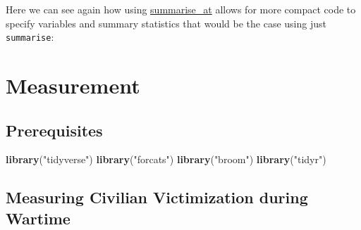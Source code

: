 \documentclass[]{book}
\newenvironment{Shaded}{\begin{snugshade}}{\end{snugshade}}
\newcommand{\CommentTok}[1]{\textcolor[rgb]{0.56,0.35,0.01}{\textit{#1}}}
\newcommand{\KeywordTok}[1]{\textcolor[rgb]{0.13,0.29,0.53}{\textbf{#1}}}
\newcommand{\NormalTok}[1]{#1}
\newcommand{\OperatorTok}[1]{\textcolor[rgb]{0.81,0.36,0.00}{\textbf{#1}}}
\newcommand{\StringTok}[1]{\textcolor[rgb]{0.31,0.60,0.02}{#1}}
\theoremstyle{definition}
\theoremstyle{definition}
\theoremstyle{definition}
\theoremstyle{remark}
\begin{document}
Here we can see again how using
\href{https://www.rdocumentation.org/packages/dplyr/topics/summarise_at}{summarise\_at}
allows for more compact code to specify variables and summary statistics
that would be the case using just \texttt{summarise}:

\begin{Shaded}
\end{Shaded}

\hypertarget{measurement}{%
\chapter{Measurement}\label{measurement}}

\hypertarget{prerequisites-2}{%
\section*{Prerequisites}\label{prerequisites-2}}

\begin{Shaded}
\begin{Highlighting}[]
\KeywordTok{library}\NormalTok{(}\StringTok{"tidyverse"}\NormalTok{)}
\KeywordTok{library}\NormalTok{(}\StringTok{"forcats"}\NormalTok{)}
\KeywordTok{library}\NormalTok{(}\StringTok{"broom"}\NormalTok{)}
\KeywordTok{library}\NormalTok{(}\StringTok{"tidyr"}\NormalTok{)}
\end{Highlighting}
\end{Shaded}

\hypertarget{measuring-civilian-victimization-during-wartime}{%
\section{Measuring Civilian Victimization during
Wartime}\label{measuring-civilian-victimization-during-wartime}}
\end{document}
